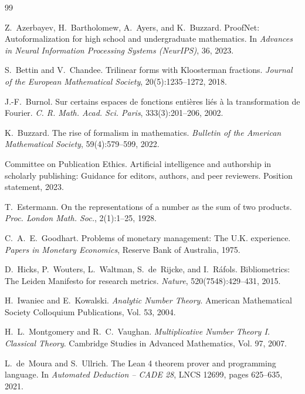 \documentclass[11pt,a4paper]{article}
\theoremstyle{definition}
\theoremstyle{remark}
\begin{document}
\begin{thebibliography}{99}

Z.~Azerbayev, H.~Bartholomew, A.~Ayers, and K.~Buzzard.
\newblock Proof{N}et: Autoformalization for high school and undergraduate mathematics.
\newblock In \emph{Advances in Neural Information Processing Systems (NeurIPS)}, 36, 2023.

S.~Bettin and V.~Chandee.
\newblock Trilinear forms with {K}loosterman fractions.
\newblock \emph{Journal of the European Mathematical Society}, 20(5):1235--1272, 2018.

J.-F.~Burnol.
\newblock Sur certains espaces de fonctions enti\`eres li\'es \`a la transformation de {F}ourier.
\newblock \emph{C. R. Math. Acad. Sci. Paris}, 333(3):201--206, 2002.

K.~Buzzard.
\newblock The rise of formalism in mathematics.
\newblock \emph{Bulletin of the American Mathematical Society}, 59(4):579--599, 2022.

Committee on Publication Ethics.
\newblock Artificial intelligence and authorship in scholarly publishing: Guidance for editors, authors, and peer reviewers.
\newblock Position statement, 2023.

T.~Estermann.
\newblock On the representations of a number as the sum of two products.
\newblock \emph{Proc. London Math. Soc.}, 2(1):1--25, 1928.

C.~A.~E.~Goodhart.
\newblock Problems of monetary management: The {U.K.} experience.
\newblock \emph{Papers in Monetary Economics}, Reserve Bank of Australia, 1975.

D.~Hicks, P.~Wouters, L.~Waltman, S.~de~Rijcke, and I.~R\'afols.
\newblock Bibliometrics: The {L}eiden {M}anifesto for research metrics.
\newblock \emph{Nature}, 520(7548):429--431, 2015.

H.~Iwaniec and E.~Kowalski.
\newblock \emph{Analytic Number Theory}.
\newblock American Mathematical Society Colloquium Publications, Vol. 53, 2004.

H.~L.~Montgomery and R.~C.~Vaughan.
\newblock \emph{Multiplicative Number Theory I. Classical Theory}.
\newblock Cambridge Studies in Advanced Mathematics, Vol. 97, 2007.

L.~de~Moura and S.~Ullrich.
\newblock The {L}ean 4 theorem prover and programming language.
\newblock In \emph{Automated Deduction -- CADE 28}, LNCS 12699, pages 625--635, 2021.


\end{thebibliography}
\end{document}
